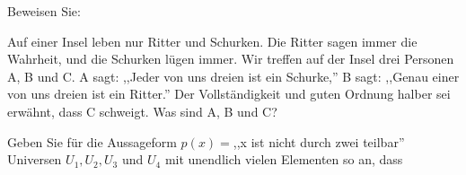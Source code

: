 \documentclass[10pt, a4paper]{exam}
\begin{document}
\begin{questions}

    \question Beweisen Sie:

    \question Auf einer Insel leben nur Ritter und Schurken. Die Ritter sagen immer die Wahrheit, und die Schurken lügen immer. Wir treffen auf der Insel drei Personen A, B und C. A sagt: ,,Jeder von uns dreien ist ein Schurke,'' B sagt: ,,Genau einer von uns dreien ist ein Ritter.'' Der Vollständigkeit und guten Ordnung halber sei erwähnt, dass C schweigt. Was sind A, B und C?

    \question Geben Sie für die Aussageform $p(x) = $,,x ist nicht durch zwei teilbar'' Universen $U_1,U_2,U_3$ und $U_4$ mit unendlich vielen Elementen so an, dass


\end{questions}
\end{document}
